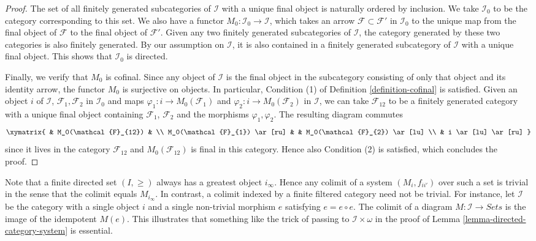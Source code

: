 \begin{proof}
\medskip\noindent
The set of all finitely generated subcategories of $\mathcal{I}$
with a unique final object is naturally ordered by inclusion.
We take $\mathcal{I}_0$ to be the category corresponding
to this set. We also have a functor
$M_0 : \mathcal{I}_0 \to \mathcal{I}$, which takes an
arrow $\mathcal{F} \subset \mathcal{F'}$ in
$\mathcal{I}_0$ to the unique map from the final object of
$\mathcal{F}$ to the final object of $\mathcal{F}'$.
Given any two finitely generated subcategories of
$\mathcal{I}$, the category generated by these two categories is
also finitely generated. By our assumption on $\mathcal{I}$, it is
also contained in a finitely generated subcategory of $\mathcal{I}$
with a unique final object. This shows that $\mathcal{I}_0$ is directed.

\medskip\noindent
Finally, we verify that $M_0$ is cofinal. Since any
object of $\mathcal{I}$ is the final object in the subcategory
consisting of only that object and its identity arrow, the functor
$M_0$ is surjective on objects. In particular, Condition (1) of
Definition \ref{definition-cofinal} is satisfied. Given
an object $i$ of $\mathcal{I}$, $\mathcal{F}_1, \mathcal{F}_2$ in
$\mathcal{I}_0$ and maps $\varphi_1 : i \to M_0(\mathcal{F}_1)$
and $\varphi_2 : i \to M_0(\mathcal{F}_2)$ in
$\mathcal{I}$, we can take $\mathcal{F}_{12}$ to be a finitely
generated category with a unique final object containing
$\mathcal{F}_1$, $\mathcal{F}_2$ and the morphisms $\varphi_1, \varphi_2$.
The resulting diagram commutes
$$
\xymatrix{
& M_0(\mathcal{F}_{12}) & \\
M_0(\mathcal{F}_{1}) \ar[ru] & & M_0(\mathcal{F}_{2}) \ar[lu] \\
& i \ar[lu] \ar[ru]
}
$$
since it lives in the category $\mathcal{F}_{12}$ and
$M_0(\mathcal{F}_{12})$ is final in
this category. Hence also Condition (2) is satisfied, which concludes
the proof.
\end{proof}

\begin{remark}
\label{remark-trick-needed}
Note that a finite directed set $(I, \geq)$ always has a greatest object
$i_\infty$. Hence any colimit of a system $(M_i, f_{ii'})$ over such a set
is trivial in the sense that the colimit equals $M_{i_\infty}$. In contrast,
a colimit indexed by a finite filtered category need not
be trivial. For instance, let $\mathcal{I}$ be the category with a single object
$i$ and a single non-trivial morphism $e$ satisfying $e = e \circ e$. The
colimit of a diagram $M : \mathcal{I} \to Sets$ is the image of the
idempotent $M(e)$. This illustrates that something like the trick of passing
to $\mathcal{I}\times \omega$ in the proof of
Lemma \ref{lemma-directed-category-system} is essential.
\end{remark}

